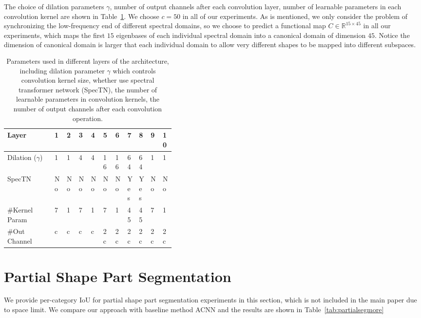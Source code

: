 The choice of dilation parameters $\gamma$, number of output channels after each convolution layer, number of learnable parameters in each convolution kernel are shown in Table~\ref{tab:architecture}. We choose $c=50$ in all of our experiments. As is mentioned, we only consider the problem of synchronizing the low-frequency end of different spectral domains, so we choose to predict a functional map $C\in\mathbb{R}^{15\times45}$ in all our experiments, which maps the first $15$ eigenbases of each individual spectral domain into a canonical domain of dimension $45$. Notice the dimension of canonical domain is larger that each individual domain to allow very different shapes to be mapped into different subspaces.

\begin{table}[]
\centering
{\footnotesize
\begin{tabular}{@{}p{0.25\linewidth}p{0.015\linewidth}p{0.015\linewidth}p{0.015\linewidth}p{0.015\linewidth}p{0.015\linewidth}p{0.015\linewidth}p{0.017\linewidth}p{0.016\linewidth}p{0.016\linewidth}p{0.015\linewidth}}
\toprule
Layer               & 1  & 2  & 3  & 4  & 5  & 6  & 7   & 8   & 9  & 10 \\ \midrule
Dilation ($\gamma$) & 1  & 1  & 4  & 4  & 16 & 16 & 64   & 64   & 1  & 1  \\
SpecTN              & No & No & No & No & No & No & Yes & Yes & No & No \\
\#Kernel Param      & 7  & 1  & 7  & 1  & 7  & 1  & 45  & 45  & 7  & 1  \\
\#Out Channel    & c  & c  & c  & c  & 2c & 2c & 2c  & 2c  & 2c & 2c\\ \bottomrule
\end{tabular}
}
\caption{Parameters used in different layers of the architecture, including dilation parameter $\gamma$ which controls convolution kernel size, whether use spectral transformer network (SpecTN), the number of learnable parameters in convolution kernels, the number of output channels after each convolution operation.}
\label{tab:architecture}
\end{table}

\section{Partial Shape Part Segmentation}
\label{sec:partial}
We provide per-category IoU for partial shape part segmentation experiments in this section, which is not included in the main paper due to space limit. We compare our approach with baseline method ACNN \cite{boscaini2016learning} and the results are shown in Table~\ref{tab:partialsegmore}

